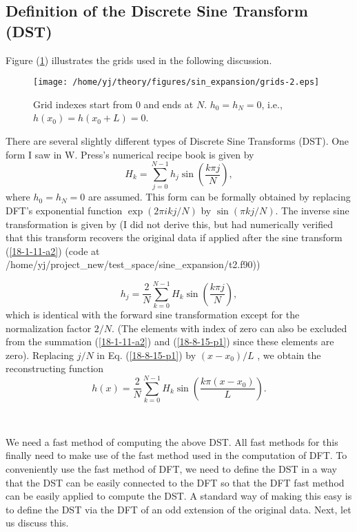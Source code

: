\documentclass{article}
\begin{document}
\subsection{Definition of the Discrete Sine Transform (DST)}

Figure (\ref{18-8-15-p3}) illustrates the grids used in the following
discussion.

\begin{figure}[h]
  \texttt{[image: /home/yj/theory/figures/sin\_expansion/grids-2.eps]}
  \caption{\label{18-8-15-p3}Grid indexes start from $0$ and ends at $N$. $h_0
  = h_N = 0$, i.e., $h (x_0) = h (x_0 + L) = 0$.}
\end{figure}

There are several slightly different types of Discrete Sine Transforms (DST).
One form I saw in W. Press's numerical recipe book is given by
\begin{equation}
  \label{18-1-11-a2} H_k = \sum_{j = 0}^{N - 1} h_j \sin \left( \frac{k \pi
  j}{N} \right),
\end{equation}
where $h_0 = h_N = 0$ are assumed. This form can be formally obtained by
replacing DFT's exponential function $\exp (2 \pi i k j / N)$ by $\sin (\pi k
j / N)$. The inverse sine transformation is given by (I did not derive this,
but had numerically verified that this transform recovers the original data if
applied after the sine transform (\ref{18-1-11-a2}) (code at
/home/yj/project\_new/test\_space/sine\_expansion/t2.f90))


\begin{equation}
  \label{18-8-15-p1} h_j = \frac{2}{N} \sum_{k = 0}^{N - 1} H_k \sin \left(
  \frac{k \pi j}{N} \right),
\end{equation}
which is identical with the forward sine transformation except for the
normalization factor $2 / N$. (The elements with index of zero can also be
excluded from the summation (\ref{18-1-11-a2}) and (\ref{18-8-15-p1}) since
these elements are zero). Replacing $j / N$ in Eq. (\ref{18-8-15-p1}) by $(x -
x_0) / L$ , we obtain the reconstructing function
\begin{equation}
  h (x) = \frac{2}{N} \sum_{k = 0}^{N - 1} H_k \sin \left( \frac{k \pi (x -
  x_0)}{L} \right) .
\end{equation}


\

We need a fast method of computing the above DST. All fast methods for this
finally need to make use of the fast method used in the computation of DFT. To
conveniently use the fast method of DFT, we need to define the DST in a way
that the DST can be easily connected to the DFT so that the DFT fast method
can be easily applied to compute the DST. A standard way of making this easy
is to define the DST via the DFT of an odd extension of the original data.
Next, let us discuss this.
\end{document}
